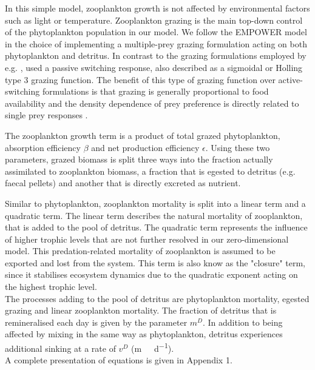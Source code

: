 \documentclass[template.tex]{subfiles}
\begin{document}
In this simple model, zooplankton growth is not affected by environmental factors such as light or temperature.
Zooplankton grazing is the main top-down control of the phytoplankton population in our model. We follow the EMPOWER model in the choice of implementing a multiple-prey grazing formulation acting on both phytoplankton and detritus. In contrast to the grazing formulations employed by e.g. \cite{Fasham1990a}, \citeauthor{Anderson2015c} used a passive switching response, also described as a sigmoidal or Holling type 3 grazing function. The benefit of this type of grazing function over active-switching formulations is that grazing is generally proportional to food availability and the density dependence of prey preference is directly related to single prey responses \citep{Gentleman2003a}.

The zooplankton growth term is a product of total grazed phytoplankton, absorption efficiency $\beta$ and net production efficiency $\epsilon$. Using these two parameters, grazed biomass is split three ways into the fraction actually assimilated to zooplankton biomass, a fraction that is egested to detritus (e.g. faecal pellets) and another that is directly excreted as nutrient. 

Similar to phytoplankton, zooplankton mortality is split into a linear term and a quadratic term. The linear term describes the natural mortality of zooplankton, that is added to the pool of detritus. The quadratic term represents the influence of higher trophic levels that are not further resolved in our zero-dimensional model. This predation-related mortality of zooplankton is assumed to be exported and lost from the system.
This term is also know as the "closure" term, since it stabilises ecosystem dynamics due to the quadratic exponent acting on the highest trophic level.\\

The processes adding to the pool of detritus are phytoplankton mortality, egested grazing and linear zooplankton mortality. The fraction of detritus that is remineralised each day is given by the parameter $m
^D$. In addition to being affected by mixing in the same way as phytoplankton, detritus experiences additional sinking at a rate of $v^D$ (\unit{m \ d^{-1}}).\\

A complete presentation of equations is given in Appendix 1.\\
\end{document}
